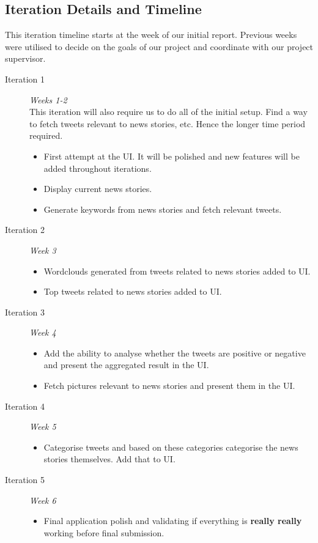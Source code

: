 \documentclass[a4paper,12pt]{article}
\begin{document}
  \subsection{Iteration Details and Timeline}
  This iteration timeline starts at the week of our initial report. Previous weeks were utilised to decide on the goals of our project and coordinate with our project supervisor.
  \begin{description}
   \item[Iteration 1] \emph{Weeks 1-2}\\
   This iteration will also require us to do all of the initial setup. Find a way to fetch tweets relevant to news stories, etc. Hence the longer time period required.
   \begin{itemize}
     \item First attempt at the UI. It will be polished and new features will be added throughout iterations.
     \item Display current news stories.
     \item Generate keywords from news stories and fetch relevant tweets.
   \end{itemize}
   \item[Iteration 2] \emph{Week 3}
   \begin{itemize}
     \item Wordclouds generated from tweets related to news stories added to UI.
     \item Top tweets related to news stories added to UI.
   \end{itemize}
   \item[Iteration 3] \emph{Week 4}
   \begin{itemize}
     \item Add the ability to analyse whether the tweets are positive or negative and present the aggregated result in the UI.
     \item Fetch pictures relevant to news stories and present them in the UI.
   \end{itemize}
   \item[Iteration 4] \emph{Week 5}
   \begin{itemize}
     \item Categorise tweets and based on these categories categorise the news stories themselves. Add that to UI.
   \end{itemize}
   \item[Iteration 5] \emph{Week 6}
   \begin{itemize}
     \item Final application polish and validating if everything is \textbf{really really} working before final submission.
   \end{itemize}
  \end{description}
	
\end{document}
